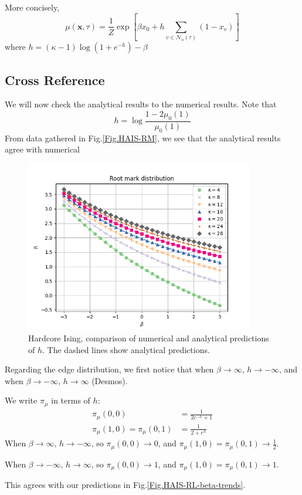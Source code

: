 \documentclass[12pt]{article}
\numberwithin{equation}{section}
\begin{document}
More concisely,
\begin{equation}
    \mu(\mathbf{x}, \tau) = \frac1Z \exp\left[\beta x_0 + h \sum_{v\in\mathcal{N}_o(\tau)}(1-x_v)\right]
\end{equation}
where $h = (\kappa - 1)\log (1+e^{-h}) - \beta $

\newpage

\subsection{Cross Reference}

We will now check the analytical results to the numerical results. Note that
\begin{equation*}
    h = \log\frac{1 - 2 \mu_0(1)}{\mu_0(1)}
\end{equation*}
From data gathered in Fig.\ref{Fig.HAIS-RM}, we see that the analytical results agree with numerical
\begin{figure}[h]
    \centering
    \includegraphics[width=10cm]{img/HA_Ising/h_value.png}
    \caption{Hardcore Ising, comparison of numerical and analytical predictions of $h$. The dashed lines show analytical predictions.}
    \label{Fig.HAIS-h-value}
\end{figure}

Regarding the edge distribution, we first notice that when $\beta\rightarrow\infty$, $h\rightarrow -\infty$, and when $\beta\rightarrow-\infty$, $h\rightarrow \infty$ (Desmos).

We write $\pi_\mu$ in terms of $h$:
\begin{align*}
    \pi_\mu(0, 0)                 & = \frac{1}{2e^{-h} + 1} \\
    \pi_\mu(1, 0) = \pi_\mu(0, 1) & = \frac{1}{2+e^h}
\end{align*}
When $\beta\rightarrow\infty$, $h\rightarrow-\infty$, so $\pi_\mu(0, 0)\rightarrow 0$, and $\pi_\mu(1, 0) = \pi_\mu(0, 1)\rightarrow \frac12$.

When $\beta\rightarrow-\infty$, $h\rightarrow\infty$, so $\pi_\mu(0, 0)\rightarrow 1$, and $\pi_\mu(1, 0) = \pi_\mu(0, 1)\rightarrow 1$.

This agrees with our predictions in Fig.\ref{Fig.HAIS-RL-beta-trends}.
\end{document}
